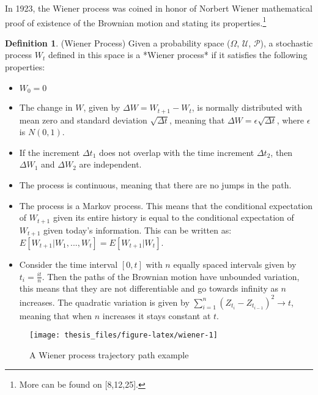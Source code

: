 \documentclass[12pt,twoside]{reedthesis}
\theoremstyle{definition}
\newtheorem{definition}{Definition}[section]
\theoremstyle{definition}
\theoremstyle{remark}
\begin{document}
  In 1923, the Wiener process was coined in honor of Norbert Wiener
  mathematical proof of existence of the Brownian motion and stating its
  properties.\footnote{More can be found on {[}8,12,25{]}.}
  \begin{definition}{(Wiener Process)} Given a probability space ($\Omega$, $\mathcal {U}$, $\mathcal {P}$), a stochastic process $W_t$ defined in this space is a *Wiener process* if it satisfies the following properties:
  \begin{itemize}
    \item  $W_{0}=0$
    
    \item The change in $W$, given by $\Delta W = W_{t+1}-W_{t}$, is normally distributed with mean zero and standard deviation $\sqrt{\Delta t}$, meaning that $\Delta W = \epsilon\sqrt{\Delta t}$, where $\epsilon$ is $N(0,1)$.
    
    \item If the increment $\Delta t_1$ does not overlap with the time increment $\Delta t_2$, then $\Delta W_1$ and $\Delta W_2$ are independent.
    
    \item The process is continuous, meaning that there are no jumps in the path.
    
    \item The process is a Markov process. This means that the conditional expectation of $W_{t+1}$ given its entire history is equal to the conditional expectation of $W_{t+1}$ given today's information. This can be written as: $E[W_{t+1}|W_1, ..., W_t] = E[W_{t+1}|W_t]$.
    
    \item Consider the time interval $[0,t]$ with $n$ equally spaced intervals given by $t_i = \frac{it}{n}$. Then the paths of the Brownian motion have unbounded variation, this means that they are not differentiable and go towards infinity as $n$ increases. The quadratic variation is given by $\sum_{i=1}^{n}{(Z_{t_i}-Z_{t_{i-1}})^2} \rightarrow t$, meaning that when $n$ increases it stays constant at $t$. 
  
  \end{itemize}
  \end{definition}
  \begin{figure}
  
  {\centering \texttt{[image: thesis\_files/figure-latex/wiener-1]} 
  
  }
  
  \caption{A Wiener process trajectory path example \label{wiener}}\label{fig:wiener}
  \end{figure}
\end{document}
